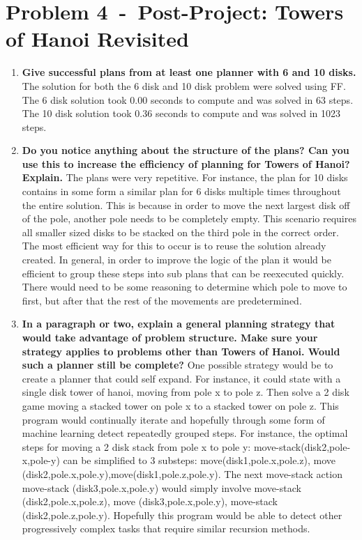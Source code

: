 \documentclass[12pt]{article}
\newcommand{\problem}[2]{\section*{Problem {#1}~-~{#2}}}
\begin{document}
\problem{4}{Post-Project: Towers of Hanoi Revisited}
\label{sec:problem_4}
\begin{enumerate}
 \item \textbf{Give successful plans from at least one planner with 6 and 10 disks.} \newline The solution for both the 6 disk and 10 disk problem were solved using FF. The 6 disk solution took 0.00 seconds to compute and was solved in 63 steps. The 10 disk solution took 0.36 seconds to compute and was solved in 1023 steps.
 \item \textbf{Do you notice anything about the structure of the plans? Can you use this to increase the
efficiency of planning for Towers of Hanoi? Explain.} \newline
   The plans were very repetitive. For instance, the plan for 10 disks contains in some form a similar plan for 6 disks multiple times throughout the entire solution. This is because in order to move the next largest disk off of the pole, another pole needs to be completely empty. This scenario requires all smaller sized disks to be stacked on the third pole in the correct order. The most efficient way for this to occur is to reuse the solution already created. In general, in order to improve the logic of the plan it would be efficient to group these steps into sub plans that can be reexecuted quickly. There would need to be some reasoning to determine which pole to move to first, but after that the rest of the movements are predetermined. 
 \item \textbf{In a paragraph or two, explain a general planning strategy that would take advantage of
problem structure. Make sure your strategy applies to problems other than Towers of Hanoi.
Would such a planner still be complete?}
\newline One possible strategy would be to create a planner that could self expand. For instance, it could state with a single disk tower of hanoi, moving from pole x to pole z. Then solve a 2 disk game moving a stacked tower on pole x to a stacked tower on pole z. This program would continually iterate and hopefully through some form of machine learning detect repeatedly grouped steps. For instance, the optimal steps for moving a 2 disk stack from pole x to pole y: move-stack(disk2,pole-x,pole-y) can be simplified to 3 substeps: move(disk1,pole.x,pole.z), move (disk2,pole.x,pole.y),move(disk1,pole.z,pole.y). The next move-stack action \- move-stack (disk3,pole.x,pole.y) would simply involve \- move-stack (disk2,pole.x,pole.z), \- move (disk3,pole.x,pole.y), \- move-stack (disk2,pole.z,pole.y). Hopefully this program would be able to detect other progressively complex tasks that require similar recursion methods.
\end{enumerate}
\end{document}
